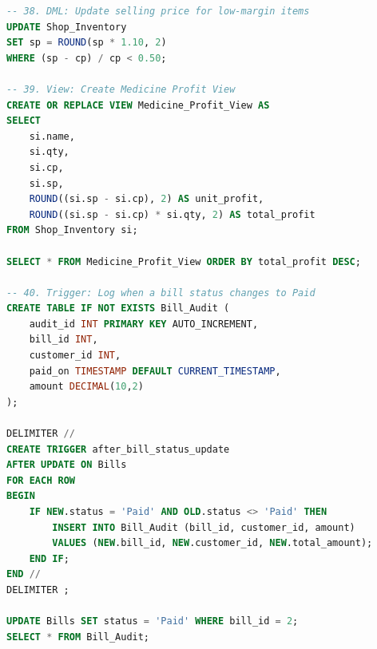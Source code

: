 \documentclass{article}
\begin{document}
\begin{lstlisting}[language=SQL, caption=Lab 5 Additional Queries]
-- 38. DML: Update selling price for low-margin items
UPDATE Shop_Inventory
SET sp = ROUND(sp * 1.10, 2)
WHERE (sp - cp) / cp < 0.50;

-- 39. View: Create Medicine Profit View
CREATE OR REPLACE VIEW Medicine_Profit_View AS
SELECT
    si.name,
    si.qty,
    si.cp,
    si.sp,
    ROUND((si.sp - si.cp), 2) AS unit_profit,
    ROUND((si.sp - si.cp) * si.qty, 2) AS total_profit
FROM Shop_Inventory si;

SELECT * FROM Medicine_Profit_View ORDER BY total_profit DESC;

-- 40. Trigger: Log when a bill status changes to Paid
CREATE TABLE IF NOT EXISTS Bill_Audit (
    audit_id INT PRIMARY KEY AUTO_INCREMENT,
    bill_id INT,
    customer_id INT,
    paid_on TIMESTAMP DEFAULT CURRENT_TIMESTAMP,
    amount DECIMAL(10,2)
);

DELIMITER //
CREATE TRIGGER after_bill_status_update
AFTER UPDATE ON Bills
FOR EACH ROW
BEGIN
    IF NEW.status = 'Paid' AND OLD.status <> 'Paid' THEN
        INSERT INTO Bill_Audit (bill_id, customer_id, amount)
        VALUES (NEW.bill_id, NEW.customer_id, NEW.total_amount);
    END IF;
END //
DELIMITER ;

UPDATE Bills SET status = 'Paid' WHERE bill_id = 2;
SELECT * FROM Bill_Audit;
\end{lstlisting}
\end{document}
